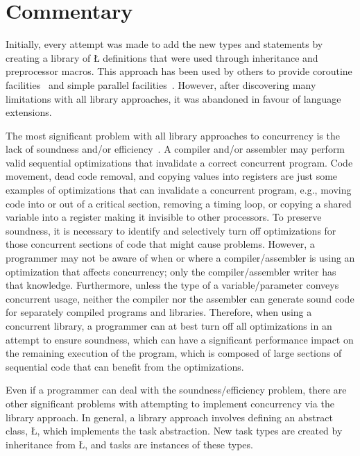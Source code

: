 \documentclass[openright,twoside]{report}
\begin{document}
\section{Commentary}
\label{s:LibraryApproach}

Initially, every attempt was made to add the new \uC types and statements by creating a library of \LGinlinetrue\LGbegin\lgrinde\L{}\endlgrinde\LGend{} definitions that were used through inheritance and preprocessor macros.
This approach has been used by others to provide coroutine facilities~\cite{Shopiro87,Labreche90} and simple parallel facilities~\cite{Doeppner87,PRESTO}.
However, after discovering many limitations with all library approaches, it was abandoned in favour of language extensions.

The most significant problem with all library approaches to concurrency is the lack of soundness and/or efficiency~\cite{Buhr95a}.
A compiler and/or assembler may perform valid sequential optimizations that invalidate a correct concurrent program.
Code movement, dead code removal, and copying values into registers are just some examples of optimizations that can invalidate a concurrent program, e.g., moving code into or out of a critical section, removing a timing loop, or copying a shared variable into a register making it invisible to other processors.
To preserve soundness, it is necessary to identify and selectively turn off optimizations for those concurrent sections of code that might cause problems.
However, a programmer may not be aware of when or where a compiler/assembler is using an optimization that affects concurrency;
only the compiler/assembler writer has that knowledge.
Furthermore, unless the type of a variable/parameter conveys concurrent usage, neither the compiler nor the assembler can generate sound code for separately compiled programs and libraries.
Therefore, when using a concurrent library, a programmer can at best turn off all optimizations in an attempt to ensure soundness, which can have a significant performance impact on the remaining execution of the program, which is composed of large sections of sequential code that can benefit from the optimizations.

Even if a programmer can deal with the soundness/efficiency problem, there are other significant problems with attempting to implement concurrency via the library approach.
In general, a library approach involves defining an abstract class, \LGinlinetrue\LGbegin\lgrinde\L{}\endlgrinde\LGend{}, which implements the task abstraction.
New task types are created by inheritance from \LGinlinetrue\LGbegin\lgrinde\L{}\endlgrinde\LGend{}, and tasks are instances of these types.
\end{document}
